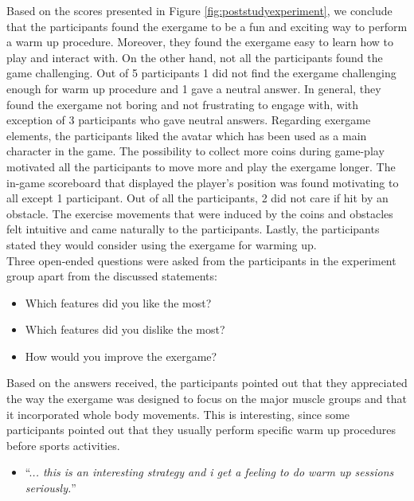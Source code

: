Based on the scores presented in Figure \ref{fig:poststudyexperiment}, we conclude that the participants found the exergame to be a fun and exciting way to perform a warm up procedure. Moreover, they found the exergame easy to learn how to play and interact with. On the other hand, not all the participants found the game challenging. Out of 5 participants 1 did not find the exergame challenging enough for warm up procedure and 1 gave a neutral answer. In general, they found the exergame not boring and not frustrating to engage with, with exception of 3 participants who gave neutral answers.  Regarding exergame elements, the participants liked the avatar which has been used as a main character in the game. The possibility to collect more coins during game-play motivated all the participants to move more and play the exergame longer. The in-game scoreboard that displayed the player's position was found motivating to all except 1 participant. Out of all the participants, 2 did not care if hit by an obstacle. The exercise movements that were induced by the coins and obstacles felt intuitive and came naturally to the participants.  Lastly, the participants stated they would consider using the exergame for warming up. \\Three open-ended questions were asked from the participants in the experiment group apart from the discussed statements:
\begin{itemize}
 \item Which features did you like the most?
 \item Which features did you dislike the most?
 \item How would you improve the exergame?
\end{itemize}
Based on the answers received, the participants pointed out that they appreciated the way the exergame was designed to focus on the major muscle groups and that it incorporated whole body movements. This is interesting, since some participants pointed out that they usually perform specific warm up procedures before sports activities.
\begin{itemize}
\item ``.\textit{.. this is an interesting strategy and i get a feeling to do warm up sessions seriously.}''
\end{itemize}
